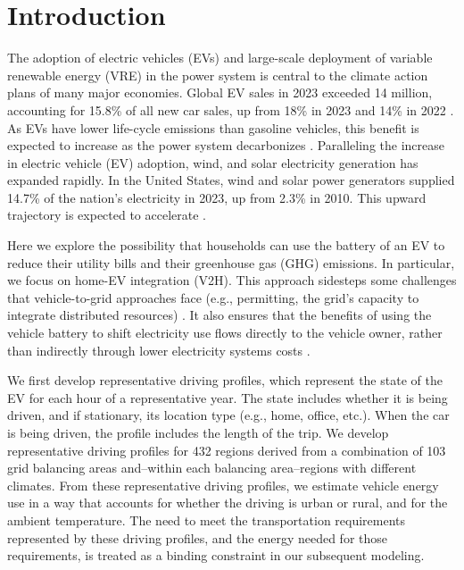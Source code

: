 \documentclass[11pt,preprint]{elsarticle}
\begin{document}
\section{Introduction}
The adoption of electric vehicles (EVs) and large-scale deployment of variable renewable energy (VRE) in the power system is central to the climate action plans of many major economies. Global EV sales in 2023 exceeded 14 million, accounting for 15.8\% of all new car sales, up from 18\% in 2023 and 14\% in 2022 \cite{
alsauskas_global_2024}. As EVs have lower life-cycle emissions than gasoline vehicles, this benefit is expected to increase as the power system decarbonizes \cite{he_economic_2019}. Paralleling the increase in electric vehicle (EV) adoption, wind, and solar electricity generation has expanded rapidly. In the United States, wind and solar power generators supplied 14.7\% of the nation's electricity in 2023, up from 2.3\% in 2010. This upward trajectory is expected to accelerate \cite{noauthor_annual_2023,gagnon_2023_2023}.

Here we explore the possibility that households can use the battery of an EV to reduce their utility bills and their greenhouse gas (GHG) emissions. In particular, we focus on home-EV integration (V2H). This approach sidesteps some challenges that vehicle-to-grid approaches face (e.g., permitting, the grid's capacity to integrate distributed resources) \cite{sovacool_beyond_2009,sovacool_future_2017}. It also ensures that the benefits of using the vehicle battery to shift electricity use flows directly to the vehicle owner, rather than indirectly through lower electricity systems costs \cite{peterson_economics_2010}.

We first develop representative driving profiles, which represent the state of the EV for each hour of a representative year. The state includes whether it is being driven, and if stationary, its location type (e.g., home, office, etc.). When the car is being driven, the profile includes the length of the trip. We develop representative driving profiles for 432 regions derived from a combination of 103 grid balancing areas and--within each balancing area--regions with different climates. From these representative driving profiles, we estimate vehicle energy use in a way that accounts for whether the driving is urban or rural, and for the ambient temperature. The need to meet the transportation requirements represented by these driving profiles, and the energy needed for those requirements, is treated as a binding constraint in our subsequent modeling. 
\end{document}
